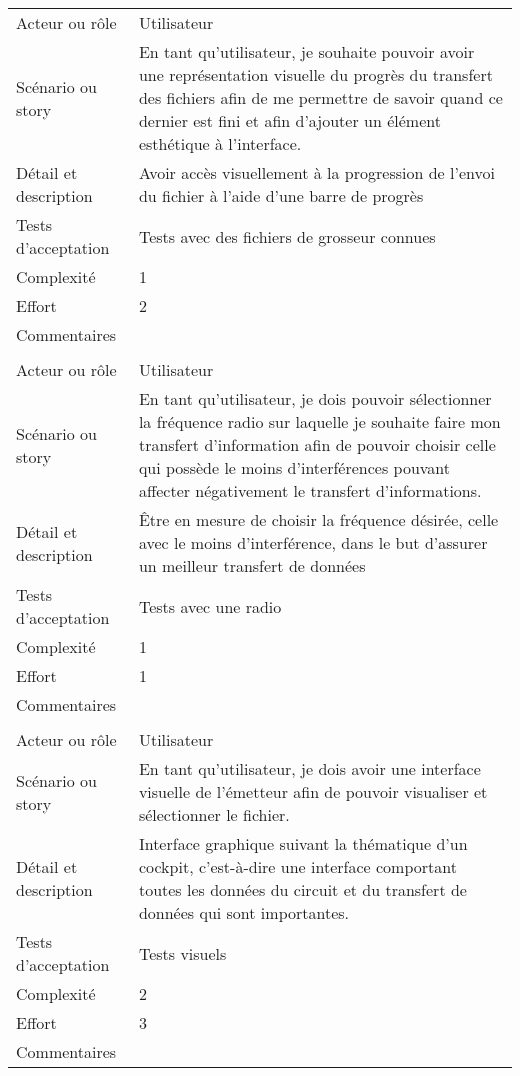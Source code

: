 \begin{longtable}{|l|p{}|}
\hline
    \rowcolor{Gray}
    \multicolumn{2}{|l|}{9} \\
\hline
    Acteur ou rôle & Utilisateur \\
\hline
    Scénario ou story &  En tant qu'utilisateur,
          je souhaite pouvoir avoir une représentation visuelle
          du progrès du transfert des fichiers afin de me permettre
          de savoir quand ce dernier est fini et afin d'ajouter un
          élément esthétique à l'interface. \\
\hline
    Détail et description & Avoir accès visuellement à la progression de l'envoi du fichier à l'aide d'une barre de progrès \\
\hline
    Tests d'acceptation & Tests avec des fichiers de grosseur connues\\
\hline
    Complexité & 1 \\
\hline
    Effort & 2 \\
\hline
    Commentaires &  \\

\hline
    \rowcolor{Gray}
    \multicolumn{2}{|l|}{10} \\
\hline
    Acteur ou rôle & Utilisateur \\
\hline
    Scénario ou story &  En tant qu'utilisateur,
          je dois pouvoir sélectionner la fréquence radio sur laquelle je
          souhaite faire mon transfert d'information afin de pouvoir choisir celle 
          qui possède le moins d'interférences pouvant affecter négativement le transfert d'informations. \\
\hline
    Détail et description & Être en mesure de choisir la fréquence désirée, celle avec le moins d'interférence, dans le but d'assurer un meilleur transfert de données \\
\hline
    Tests d'acceptation & Tests avec une radio\\
\hline
    Complexité & 1 \\
\hline
    Effort & 1 \\
\hline
    Commentaires &  \\

\hline
    \rowcolor{Gray}
    \multicolumn{2}{|l|}{11} \\
\hline
    Acteur ou rôle & Utilisateur \\
\hline
    Scénario ou story & En tant qu'utilisateur,
          je dois avoir une interface visuelle de l'émetteur afin
          de pouvoir visualiser et sélectionner le fichier.\\
\hline
    Détail et description & Interface graphique suivant la thématique d'un cockpit, c'est-à-dire une interface comportant toutes les données du circuit et du transfert de données qui sont importantes. \\
\hline
    Tests d'acceptation & Tests visuels\\
\hline
    Complexité & 2 \\
\hline
    Effort & 3\\
\hline
    Commentaires &  \\


\end{longtable}
